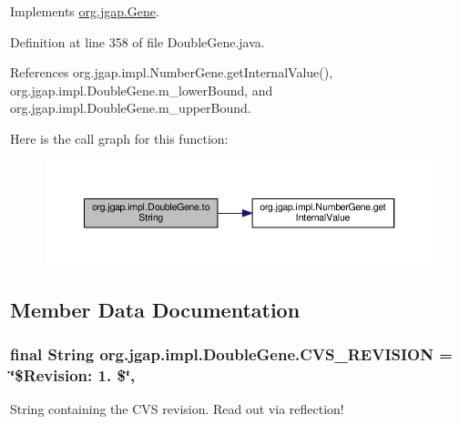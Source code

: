 Implements \hyperlink{interfaceorg_1_1jgap_1_1_gene_ac62239b4b7bf81179fd491a4c4bd1901}{org.\-jgap.\-Gene}.



Definition at line 358 of file Double\-Gene.\-java.



References org.\-jgap.\-impl.\-Number\-Gene.\-get\-Internal\-Value(), org.\-jgap.\-impl.\-Double\-Gene.\-m\-\_\-lower\-Bound, and org.\-jgap.\-impl.\-Double\-Gene.\-m\-\_\-upper\-Bound.



Here is the call graph for this function\-:
\nopagebreak
\begin{figure}[H]
\begin{center}
\leavevmode
\includegraphics[width=350pt]{classorg_1_1jgap_1_1impl_1_1_double_gene_a9819e6f329bd77276a5821b4c433cd6e_cgraph}
\end{center}
\end{figure}




\subsection{Member Data Documentation}
\hypertarget{classorg_1_1jgap_1_1impl_1_1_double_gene_aae41c294c77e89a7971fd485b9454507}{
\subsubsection[{C\-V\-S\-\_\-\-R\-E\-V\-I\-S\-I\-O\-N}]{\setlength{\rightskip}{0pt plus 5cm}final String org.\-jgap.\-impl.\-Double\-Gene.\-C\-V\-S\-\_\-\-R\-E\-V\-I\-S\-I\-O\-N = \char`\"{}\$Revision\-: 1. \$\char`\"{}\hspace{0.3cm}{\ttfamily [static]}, {\ttfamily [private]}}}\label{classorg_1_1jgap_1_1impl_1_1_double_gene_aae41c294c77e89a7971fd485b9454507}
String containing the C\-V\-S revision. Read out via reflection! 

